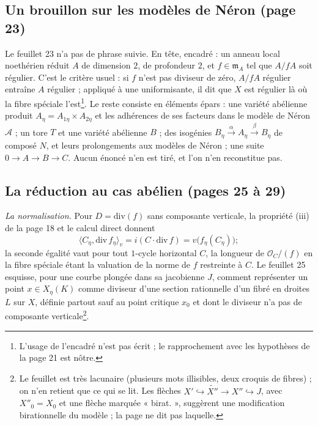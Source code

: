 \documentclass[11pt,a4paper]{article}
\begin{document}
\subsection*{Un brouillon sur les modèles de Néron (page 23)}

Le feuillet 23 n'a pas de phrase suivie. En tête, encadré : un anneau local
noethérien réduit $A$ de dimension $2$, de profondeur $2$, et
$f \in \mathfrak{m}_A$ tel que $A/fA$ soit régulier. C'est le critère
usuel : si $f$ n'est pas diviseur de zéro, $A/fA$ régulier entraîne $A$
régulier ; appliqué à une uniformisante, il dit que $X$ est régulier là où
la fibre spéciale l'est\footnote{L'usage de l'encadré n'est pas écrit ; le
rapprochement avec les hypothèses de la page 21 est nôtre.}. Le reste
consiste en éléments épars : une variété abélienne produit
$A_\eta = A_{1\eta} \times A_{2\eta}$ et les adhérences de ses facteurs
dans le modèle de Néron $\mathcal{A}$ ; un tore $T$ et une variété
abélienne $B$ ; des isogénies $B_\eta \xrightarrow{\alpha} A_\eta
\xrightarrow{\beta} B_\eta$ de composé $N$, et leurs prolongements aux
modèles de Néron ; une suite $0 \to A \to B \to C$. Aucun énoncé n'en
est tiré, et l'on n'en reconstitue pas.

\subsection*{La réduction au cas abélien (pages 25 à 29)}

\emph{La normalisation.} Pour $D = \mathrm{div}(f)$ sans composante
verticale, la propriété (iii) de la page 18 et le calcul direct donnent
\[
  \langle C_\eta, \mathrm{div}\,f_\eta\rangle_v = i(C \cdot \mathrm{div}\,f)
  = v\bigl(f_\eta(C_\eta)\bigr) ;
\]
la seconde égalité vaut pour tout $1$-cycle horizontal $C$, la longueur de
$\mathcal{O}_C/(f)$ en la fibre spéciale étant la valuation de la norme de
$f$ restreinte à $C$. Le feuillet 25 esquisse, pour une courbe plongée
dans sa jacobienne $J$, comment représenter un point $x \in X_\eta(K)$
comme diviseur d'une section rationnelle d'un fibré en droites $L$ sur $X$,
définie partout sauf au point critique $x_0$ et dont le diviseur n'a pas de
composante verticale\footnote{Le feuillet est très lacunaire (plusieurs
mots illisibles, deux croquis de fibres) ; on n'en retient que ce qui se
lit. Les flèches $X' \hookrightarrow \widetilde{X''} \to X'' \hookrightarrow
J$, avec $X''_0 = X_0$ et une flèche marquée « birat. », suggèrent une
modification birationnelle du modèle ; la page ne dit pas laquelle.}.
\end{document}
